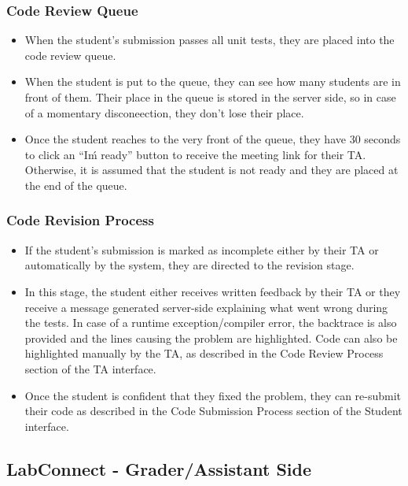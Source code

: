 \documentclass[a4paper, 12pt]{article}
\begin{document}
    \subsubsection{Code Review Queue}

    \begin{itemize}

      \item When the student's submission passes all unit tests, they are placed into the code review queue.
      \item When the student is put to the queue, they can see how many students are in front of them. Their place in the queue is
      stored in the server side, so in case of a momentary disconeection, they don't lose their place.
      \item Once the student reaches to the very front of the queue, they have 30 seconds to click an ``I\'m ready''
      button to receive the meeting link for their TA. Otherwise, it is assumed that the student is not ready and they
      are placed at the end of the queue.
    \end{itemize}

    \subsubsection{Code Revision Process}


    \begin{itemize}
      \item If the student's submission is marked as incomplete either by their TA or automatically by the system, they are directed
      to the revision stage.
      \item In this stage, the student either receives written feedback by their TA or they receive a message generated server-side explaining
      what went wrong during the tests. In case of a runtime exception/compiler error, the backtrace is also provided and the lines causing the
      problem are highlighted. Code can also be highlighted manually by the TA, as described in the Code Review Process section of the TA interface.
      \item Once the student is confident that they fixed the problem, they can re-submit their code as described in the Code Submission Process
      section of the Student interface.
    \end{itemize}

    \subsection{LabConnect - Grader/Assistant Side}
\end{document}
